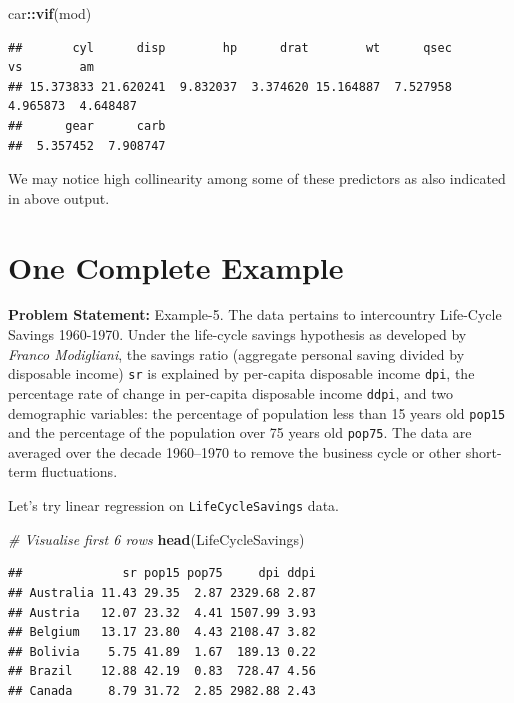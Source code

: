 \documentclass[
]{book}
\newenvironment{Shaded}{\begin{snugshade}}{\end{snugshade}}
\newcommand{\CommentTok}[1]{\textcolor[rgb]{0.56,0.35,0.01}{\textit{#1}}}
\newcommand{\FunctionTok}[1]{\textcolor[rgb]{0.13,0.29,0.53}{\textbf{#1}}}
\newcommand{\NormalTok}[1]{#1}
\newcommand{\SpecialCharTok}[1]{\textcolor[rgb]{0.81,0.36,0.00}{\textbf{#1}}}
\begin{document}
\begin{Shaded}
\begin{Highlighting}[]
\NormalTok{car}\SpecialCharTok{::}\FunctionTok{vif}\NormalTok{(mod)}
\end{Highlighting}
\end{Shaded}

\begin{verbatim}
##       cyl      disp        hp      drat        wt      qsec        vs        am 
## 15.373833 21.620241  9.832037  3.374620 15.164887  7.527958  4.965873  4.648487 
##      gear      carb 
##  5.357452  7.908747
\end{verbatim}

We may notice high collinearity among some of these predictors as also indicated in above output.

\hypertarget{one-complete-example}{%
\section{One Complete Example}\label{one-complete-example}}

\textbf{Problem Statement:} Example-5. The data pertains to intercountry Life-Cycle Savings 1960-1970. Under the life-cycle savings hypothesis as developed by \emph{Franco Modigliani}, the savings ratio (aggregate personal saving divided by disposable income) \texttt{sr} is explained by per-capita disposable income \texttt{dpi}, the percentage rate of change in per-capita disposable income \texttt{ddpi}, and two demographic variables: the percentage of population less than 15 years old \texttt{pop15} and the percentage of the population over 75 years old \texttt{pop75}. The data are averaged over the decade 1960--1970 to remove the business cycle or other short-term fluctuations.

Let's try linear regression on \texttt{LifeCycleSavings} data.

\begin{Shaded}
\begin{Highlighting}[]
\CommentTok{\# Visualise first 6 rows}
\FunctionTok{head}\NormalTok{(LifeCycleSavings)}
\end{Highlighting}
\end{Shaded}

\begin{verbatim}
##              sr pop15 pop75     dpi ddpi
## Australia 11.43 29.35  2.87 2329.68 2.87
## Austria   12.07 23.32  4.41 1507.99 3.93
## Belgium   13.17 23.80  4.43 2108.47 3.82
## Bolivia    5.75 41.89  1.67  189.13 0.22
## Brazil    12.88 42.19  0.83  728.47 4.56
## Canada     8.79 31.72  2.85 2982.88 2.43
\end{verbatim}
\end{document}

